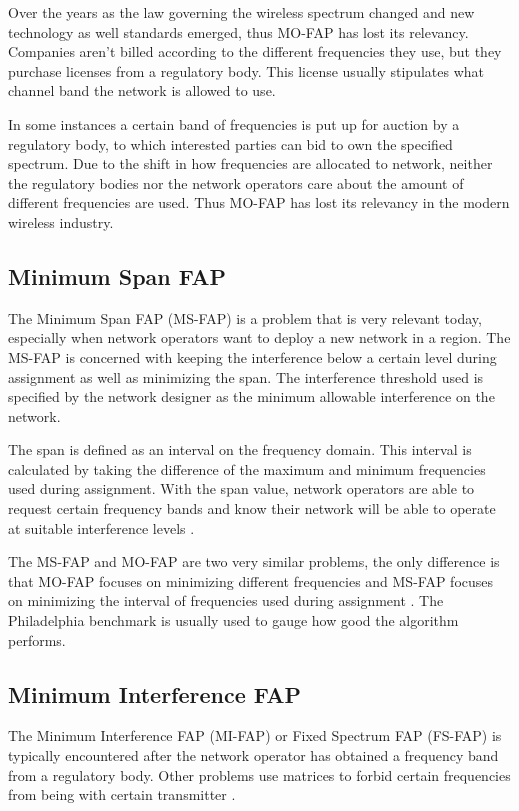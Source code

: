 Over the years as the law governing the wireless spectrum changed and new technology as well standards emerged, thus MO-FAP has lost its relevancy. Companies aren't billed according to the different frequencies they use, but they purchase licenses from a regulatory body. This license usually stipulates what channel band the network is allowed to use.

In some instances a certain band of frequencies is put up for auction by a regulatory body, to which interested parties can bid to own the specified spectrum. Due to the shift in how frequencies are allocated to network, neither the regulatory bodies nor the network operators care about the amount of different frequencies are used. Thus MO-FAP has lost its relevancy in the modern wireless industry.
\subsection{Minimum Span FAP}
The Minimum Span FAP (MS-FAP) is a problem that is very relevant today, especially when network operators want to deploy a new network in a region. The MS-FAP is concerned with keeping the interference below a certain level during assignment as well as minimizing the span. The interference threshold used is specified by the network designer as the minimum allowable interference on the network.

The span is defined as an interval on the frequency domain. This interval is calculated by taking the difference of the maximum and minimum frequencies used during assignment. With the span value, network operators are able to request certain frequency bands and know their network will be able to operate at suitable interference levels \cite{Karen2004,MontemanniThesis,MSFAP}.

The MS-FAP and MO-FAP are two very similar problems, the only difference is that MO-FAP focuses on minimizing different frequencies and MS-FAP focuses on minimizing the interval of frequencies used during assignment \cite{Karen2004}. The Philadelphia benchmark is usually used to gauge how good the algorithm performs.
\subsection{Minimum Interference FAP}
The Minimum Interference FAP (MI-FAP) or Fixed Spectrum FAP (FS-FAP) is typically encountered after the network operator has obtained a frequency band from a regulatory body. Other problems use matrices to forbid certain frequencies from being with certain transmitter \cite{Karen2004,Eisenblatter,MontemanniThesis,MultipleBinaryFAP}. 

